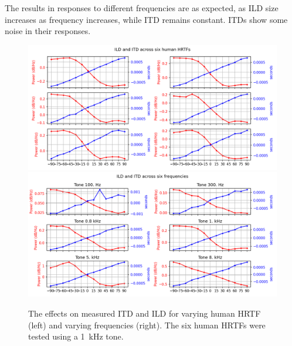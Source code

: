 \documentclass[11pt,a4paper]{article}
\begin{document}
The results in responses to different frequencies are as expected, as ILD size increases as frequency increases, while ITD remains constant. ITDs show some noise in their responses.

\begin{figure}[H]
    \centering
    \includegraphics[width=0.48\linewidth]{Images/itd_ild_diff_hrtf.png}
    \includegraphics[width=0.48\linewidth]{Images/itd_ild_diff_freq.png}
    \caption{The effects on measured ITD and ILD for varying human HRTF (left) and varying frequencies (right). The six human HRTFs were tested using a \qty{1}{\kilo\hertz} tone.}
    \label{fig:itd-ild-diff-hrtf-freq}
\end{figure}
\end{document}
